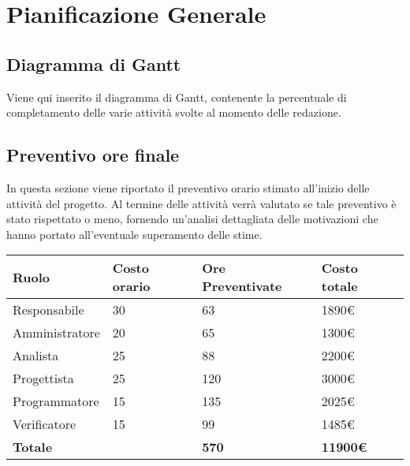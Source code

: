 \documentclass[12pt]{article}
\begin{document}
\section{Pianificazione Generale}
\subsection{Diagramma di Gantt}
Viene qui inserito il diagramma di Gantt, contenente la percentuale di completamento delle varie attività svolte al momento delle redazione.
\begin{center}
\end{center}

\subsection{Preventivo ore finale}
In questa sezione viene riportato il preventivo orario stimato all'inizio delle attività del progetto. Al termine delle attività verrà valutato se tale preventivo è stato rispettato o meno, fornendo un'analisi dettagliata delle motivazioni che hanno portato all'eventuale superamento delle stime.
\begin{center}  
    \begin{tabular}{|l|l|l|l|}
        \hline
        \textbf{Ruolo} & \textbf{Costo orario} & \textbf{Ore Preventivate} & \textbf{Costo totale}\\
        \hline
        Responsabile & 30 & 63 & 1890\euro  \\ 
        \hline
        Amministratore & 20 & 65 & 1300\euro \\
        \hline
        Analista & 25 & 88 & 2200\euro \\
        \hline
        Progettista & 25 & 120 & 3000\euro \\
        \hline
        Programmatore & 15 & 135 & 2025\euro \\
        \hline
        Verificatore & 15 & 99 & 1485\euro \\
        \hline
        \textbf{Totale} &  & \textbf{570} & \textbf{11900\euro} \\
        \hline
    \end{tabular}
\end{center}
\end{document}
